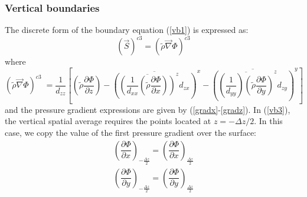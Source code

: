 \subsubsection {Vertical boundaries }
The discrete form of the boundary equation (\ref{vb1}) is expressed as:
\begin{equation}
\left(\vec{S}\right)^{c3} = \left( \tilde{\rho} \overrightarrow{\nabla} \Phi
 \right) ^{c3}
\end{equation}
where
\begin{equation}
\label{vb3}
\left( \tilde{\rho}  \overrightarrow{\nabla} \Phi \right) ^{c3} \;   =
\dfrac{1}{d_{zz}}
\left[ \left( \tilde{\rho} \dfrac {\partial \Phi}{\partial z} \right)  -
\overline{\left( \overline{\left(
 \dfrac{ 1}{d_{xx}}\left(\tilde{\rho}  \dfrac {\partial \Phi}{\partial x}
\right) \right)}^{z} d_{zx}\right)}^{x}
-  \overline{\left( \overline{\left(\dfrac{ 1
}{d_{yy}}\right)\left(\tilde{\rho} \dfrac {\partial
\Phi}{\partial y} \right)}^{z}d_{zy}\right)}^{y}\right]
\end{equation}
and the pressure gradient expressions are given by (\ref{gradx}-\ref{gradz}).
In (\ref{vb3}), the vertical spatial average requires the points located at
$z = - \Delta z/2$. In this case, we copy the value of the first
pressure gradient over the surface:
\begin{eqnarray*}
\left( \dfrac {\partial \Phi} {\partial x} \right)_{-\frac{\Delta z}{2} } =
 \left( \dfrac {\partial \Phi} {\partial x} \right)_{\frac{\Delta z}{2} } \\
\left( \dfrac {\partial \Phi} {\partial y} \right)_{-\frac{\Delta z}{2} } =
 \left( \dfrac {\partial \Phi} {\partial y} \right)_{\frac{\Delta z}{2} } \\
\end{eqnarray*}
